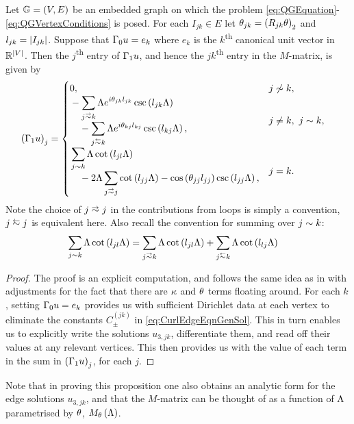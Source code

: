 \begin{prop} \label{prop:M-MatrixEntries}
	Let $\mathbb{G}=\left( V,E \right)$ be an embedded graph on which the problem \eqref{eq:QGEquation}-\eqref{eq:QGVertexConditions} is posed.
	For each $I_{jk}\in E$ let $\theta_{jk} = \left( R_{jk}\theta \right)_2$ and $l_{jk} = \left\lvert I_{jk} \right\rvert$.
	Suppose that $\Gamma_0 u = e_k$ where $e_k$ is the $k$\textsuperscript{th} canonical unit vector in $\mathbb{R}^{\left\lvert V \right\rvert}$.
	Then the $j$\textsuperscript{th} entry of $\Gamma_1 u$, and hence the $jk$\textsuperscript{th} entry in the $M$-matrix, is given by
	\begin{align*}
		\bracs{\nmap u}_j &= 
		\begin{cases}
			\!\begin{aligned}
				&0,
			\end{aligned}			
			& j \not\con k, \\
			\!\begin{aligned}
				&-\sum_{j\conLeft k} \effFreq e^{i\qm_{jk}l_{jk}} \csc\bracs{l_{jk}\effFreq} 
				\\ &\quad - \sum_{j\conRight k} \effFreq e^{i\qm_{kj}l_{kj}} \csc\bracs{l_{kj}\effFreq},
			\end{aligned}
			& j\neq k, \ j\con k, \\
			\!\begin{aligned}
				&\sum_{j\con k} \effFreq\cot\bracs{l_{jl}\effFreq}
				\\ &\quad - 2\effFreq\sum_{j\conLeft j} \cot\bracs{l_{jj}\effFreq} - \cos\bracs{\qm_{jj}l_{jj}}\csc\bracs{l_{jj}\effFreq},
			\end{aligned}
			& j=k.
		\end{cases}
	\end{align*}
	Note the choice of $j\conLeft j$ in the contributions from loops is simply a convention, $j\conRight j$ is equivalent here.
	Also recall the convention for summing over $j\sim k$:
	\begin{align*}
		\sum_{j\con k} \effFreq\cot\bracs{l_{jl}\effFreq} &= \sum_{j\conLeft k} \effFreq\cot\bracs{l_{jl}\effFreq}	+ \sum_{j\conRight k} \effFreq\cot\bracs{l_{lj}\effFreq}
	\end{align*}
\end{prop}
\begin{proof}
	The proof is an explicit computation, and follows the same idea as in  with adjustments for the fact that there are $\kappa$ and $\theta$ terms floating around.
	For each $k$, setting $\Gamma_0 u = e_k$ provides us with sufficient Dirichlet data at each vertex to eliminate the constants $C^{(jk)}_{\pm}$ in \eqref{eq:CurlEdgeEqnGenSol}.
	This in turn enables us to explicitly write the solutions $u_{3,jk}$, differentiate them, and read off their values at any relevant vertices.
	This then provides us with the value of each term in the sum in $\left( \Gamma_1 u \right)_j$, for each $j$.
\end{proof}
Note that in proving this proposition one also obtains an analytic form for the edge solutions $u_{3,jk}$, and that the $M$-matrix can be thought of as a function of $\Lambda$ parametrised by $\theta$, $M_{\theta}\left( \Lambda \right)$.

